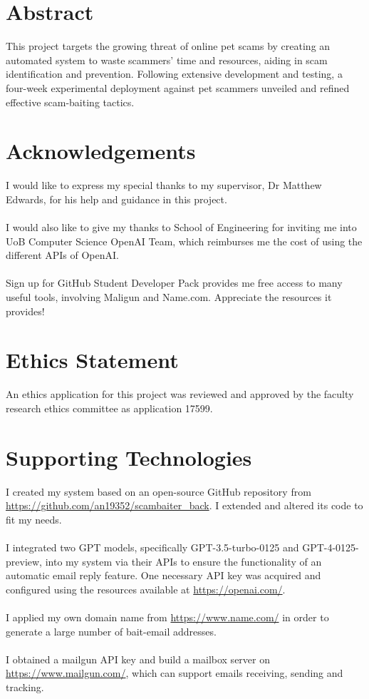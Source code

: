 \documentclass[ oneside,%
                    author={Cassie Qing Tang},
                    degree={BSc},
                     title={An Automated Response System for Disrupting Online Pet Scamming \\ },
                    subtitle={ }]{dissertation}
\begin{document}
\maketitle
\fronmatter

\chapter*{Abstract}
This project targets the growing threat of online pet scams by creating an automated system to waste scammers' time and resources, aiding in scam identification and prevention. Following extensive development and testing, a four-week experimental deployment against pet scammers unveiled and refined effective scam-baiting tactics.

\chapter*{Acknowledgements}
I would like to express my special thanks to my supervisor, Dr Matthew Edwards, for his help and guidance in this project.
\\
\\
I would also like to give my thanks to School of Engineering for inviting me into UoB Computer Science OpenAI Team, which reimburses me the cost of using the different APIs of OpenAI.
\\
\\
Sign up for GitHub Student Developer Pack provides me free access to many useful tools, involving Maligun and Name.com. Appreciate the resources it provides!

\makedecl


\tableofcontents
\listoffigures
\listoftables

\chapter*{Ethics Statement}
An ethics application for this project was reviewed and approved by the faculty research ethics committee as application 17599.


\chapter*{Supporting Technologies}
I created my system based on an open-source GitHub repository from \url{https://github.com/an19352/scambaiter_back}. I extended and altered its code to fit my needs.
\\
\\
I integrated two GPT models, specifically GPT-3.5-turbo-0125 and GPT-4-0125-preview, into my system via their APIs to ensure the functionality of an automatic email reply feature. One necessary API key was acquired and configured using the resources available at \url{https://openai.com/}.
\\
\\
I applied my own domain name from \url{https://www.name.com/} in order to generate a large number of bait-email addresses.
\\
\\
I obtained a mailgun API key and build a mailbox server on \url{https://www.mailgun.com/}, which can support emails receiving, sending and tracking.
\end{document}
